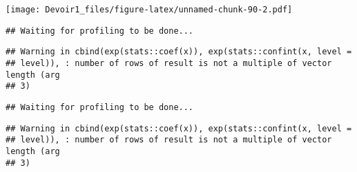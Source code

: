 \documentclass[]{article}
\newenvironment{Shaded}{\begin{snugshade}}{\end{snugshade}}
\newcommand{\KeywordTok}[1]{\textcolor[rgb]{0.13,0.29,0.53}{\textbf{#1}}}
\newcommand{\DataTypeTok}[1]{\textcolor[rgb]{0.13,0.29,0.53}{#1}}
\newcommand{\DecValTok}[1]{\textcolor[rgb]{0.00,0.00,0.81}{#1}}
\newcommand{\StringTok}[1]{\textcolor[rgb]{0.31,0.60,0.02}{#1}}
\newcommand{\OperatorTok}[1]{\textcolor[rgb]{0.81,0.36,0.00}{\textbf{#1}}}
\newcommand{\NormalTok}[1]{#1}
\begin{document}
\texttt{[image: Devoir1\_files/figure-latex/unnamed-chunk-90-2.pdf]}

\begin{Shaded}
\end{Shaded}

\begin{verbatim}
## Waiting for profiling to be done...
\end{verbatim}

\begin{verbatim}
## Warning in cbind(exp(stats::coef(x)), exp(stats::confint(x, level =
## level)), : number of rows of result is not a multiple of vector length (arg
## 3)
\end{verbatim}

\begin{verbatim}
## Waiting for profiling to be done...
\end{verbatim}

\begin{verbatim}
## Warning in cbind(exp(stats::coef(x)), exp(stats::confint(x, level =
## level)), : number of rows of result is not a multiple of vector length (arg
## 3)
\end{verbatim}
\end{document}
